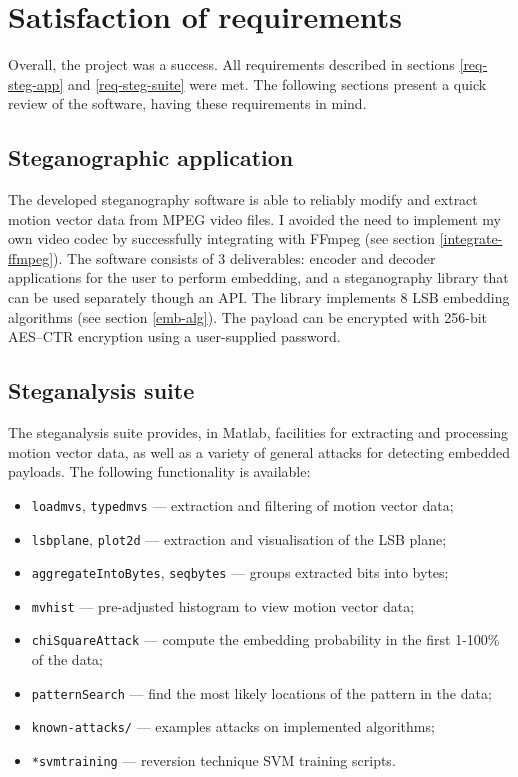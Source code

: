 \documentclass[12pt,british,twoside,notitlepage,usenames,dvipsnames,hypens,final]{report}
\numberwithin{equation}{section}
\numberwithin{figure}{section}
\begin{document}
\section{Satisfaction of requirements}

Overall, the project was a success. All requirements described in sections \ref{req-steg-app} and \ref{req-steg-suite} were met. The following sections present a quick review of the software, having these requirements in mind.

\subsection{Steganographic application}

The developed steganography software is able to reliably modify and extract motion vector data from MPEG video files. I avoided the need to implement my own video codec by successfully integrating with FFmpeg (see section \ref{integrate-ffmpeg}). The software consists of 3 deliverables: encoder and decoder applications for the user to perform embedding, and a steganography library that can be used separately though an API. The library implements 8 LSB embedding algorithms (see section \ref{emb-alg}). The payload can be encrypted with 256-bit AES--CTR encryption using a user-supplied password. 

\subsection{Steganalysis suite}

The steganalysis suite provides, in Matlab, facilities for extracting and processing motion vector data, as well as a variety of general attacks for detecting embedded payloads. The following functionality is available:

\begin{multicols}{2}
\begin{itemize}
\item \texttt{loadmvs}, \texttt{typedmvs} --- extraction and filtering of motion vector data;
\item \texttt{lsbplane}, \texttt{plot2d} --- extraction and visualisation of the LSB plane;
\item \texttt{aggregateIntoBytes}, \texttt{seqbytes} --- groups extracted bits into bytes;
\item \texttt{mvhist} --- pre-adjusted histogram to view motion vector data;
\item \texttt{chiSquareAttack} --- compute the embedding probability in the first 1-100\% of the data;
\item \texttt{patternSearch} --- find the most likely locations of the pattern in the data;
\item \texttt{known-attacks/} --- examples attacks on implemented algorithms;
\item \texttt{*svmtraining} --- reversion technique SVM training scripts.
\end{itemize}
\end{multicols}
\end{document}
